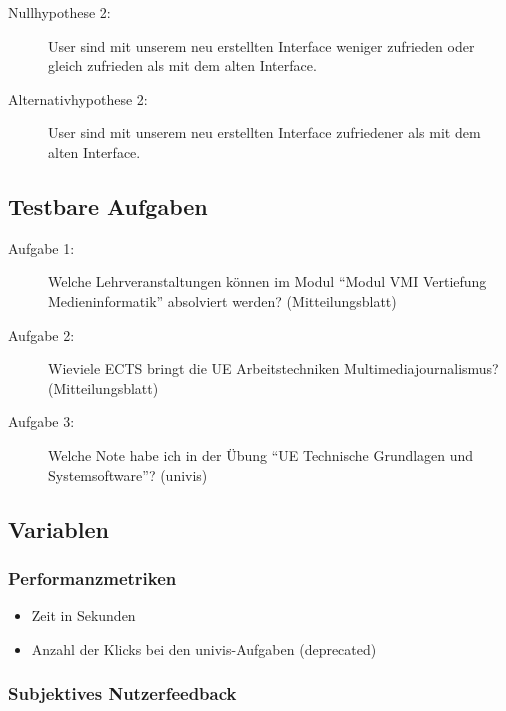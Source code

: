 \documentclass[a4paper,10pt]{scrartcl}
\begin{document}
\begin{description}
 \item[Nullhypothese 2: ] User sind mit unserem neu erstellten Interface weniger zufrieden oder gleich zufrieden als mit dem alten Interface. 
 \item[Alternativhypothese 2: ] User sind mit unserem neu erstellten Interface zufriedener als mit dem alten Interface. 
\end{description}


\subsection{Testbare Aufgaben}

\begin{description}
 \item[Aufgabe 1:] Welche Lehrveranstaltungen können im Modul ``Modul VMI Vertiefung Medieninformatik'' absolviert werden? (Mitteilungsblatt)
 \item[Aufgabe 2:] Wieviele ECTS bringt die UE Arbeitstechniken Multimediajournalismus? (Mitteilungsblatt)
 \item[Aufgabe 3:] Welche Note habe ich in der Übung ``UE Technische Grundlagen und Systemsoftware''? (univis)
\end{description}

\subsection{Variablen}

\subsubsection{Performanzmetriken}

\begin{itemize}
 \item Zeit in Sekunden
 \item Anzahl der Klicks bei den univis-Aufgaben (deprecated)
\end{itemize}

\subsubsection{Subjektives Nutzerfeedback}
\end{document}
